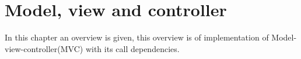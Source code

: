 \chapter{Model, view and controller}
\label{chap_mvc_start}
In this chapter an overview is given, this overview is of implementation of Model-view-controller(MVC) with its call dependencies.

